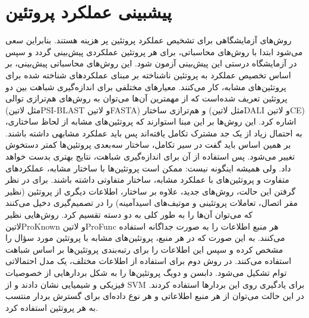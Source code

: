 \section{پیشبینی عملکرد پروتئین}\label{sec:protein-function-prediction-review}
 روش‌های آزمایشگاهی برای تشخیص عملکرد پروتئین پر هزینه هستند. بنابراین سعی می‌شود ابتدا با روش‌های محاسباتی، برای هر پروتئین عملکردی پیش‌بینی گردد و سپس در آزمایشگاه درستی این پیش‌بینی آزمون شود. این روش‌های محاسباتی پیش‌بینی، بر اساس تخصیص عملکرد به پروتئین ناشناخته بر مبنای عملکردهای شناخته شده برای پروتئین‌های مشابه، کار می‌کنند. معیارهای مختلفی برای اندازه‌گیری شباهت بین دو پروتئین تعریف شده‌است که از مهمترین آن‌ها می‌توان به روش‌های هم‌ترازی توالی (مثل ‌لاتین{PSI-BLAST} و ‌لاتین{FASTA}) و هم‌ترازی ساختار (مثل ‌لاتین{DALI} و ‌لاتین{CE}) اشاره کرد. این روش‌ها بر این مبنا استوارند که پروتئین‌های مشابه از لحاظ ساختاری، به احتمال زیاد از یک جد مشترک تکامل یافته‌اند پس باید عملکرد مشابهی داشته باشند. بر همین اساس باید گفت در سیر تکامل، ساختار سه‌بعدی پروتئین‌ها کمتر دستخوش تغییر می‌شود. پس استفاده از آن برای اندازه‌گیری شباهت، نتایج بهتری بدست خواهد داد. ولی همیشه اینگونه نیست: ممکن است پروتئین‌ها با ساختار مشابه، عملکردهای متفاوت و پروتئین‌های با عملکرد مشابه، ساختار متفاوتی داشته باشند. برای در نظر گرفتن این حالت، روش‌های جدید، علاوه بر ساختار، اطلاعات دیگری از پروتئین (نظیر مقر اتصال، تعاملات پروتئینی و موتیف‌های اسیدآمینه) را در تصمیم‌گیری دخیل می‌کنند که می‌توان آن‌ها را به طور کلی به دو دسته تقسیم کرد. روش‌هایی نظیر ‌لاتین{ProKnown} و ‌لاتین{ProFunc} هر منبع اطلاعات را به صورت جداگانه استفاده می‌کنند. به این صورت که در هر منبع، پروتئین‌های مشابه با پروتئین مورد سؤال را مشخص کرده و سپس این اطلاعات را برای رتبه‌بندی پروتئین‌ها بر اساس شباهت استفاده می‌کنند. در روش دوم برای استفاده از اطلاعات مختلف، یک مدل احتمالاتی توام تشکیل می‌شود. دابسن و دویگ  پروتئین‌ها را به شکل بردارهایی از خصوصیات فیزیکی و شیمیایی نشان دادند و از SVM برای یادگیری روی این بردارها استفاده کردند. در این حالت می‌توان از هر منبع اطلاعاتی و هر نوع داده‌ای برای گسترش بردار منتسب به هر پروتئین استفاده کرد.

